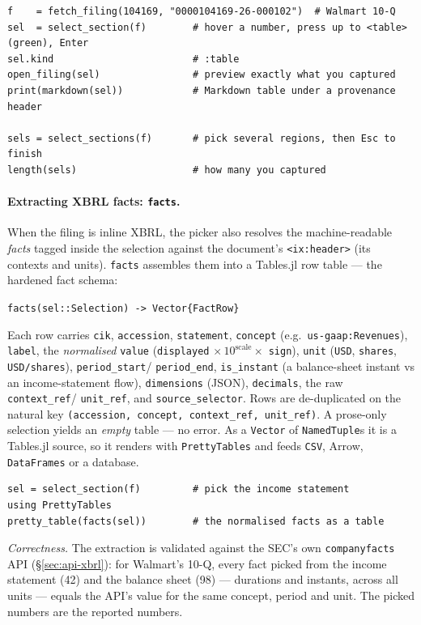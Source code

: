 \documentclass[11pt,a4paper]{report}
\newcommand{\sig}[1]{\medskip\noindent\texttt{#1}\par\medskip}
\begin{document}
\begin{lstlisting}
f    = fetch_filing(104169, "0000104169-26-000102")  # Walmart 10-Q
sel  = select_section(f)        # hover a number, press up to <table> (green), Enter
sel.kind                        # :table
open_filing(sel)                # preview exactly what you captured
print(markdown(sel))            # Markdown table under a provenance header

sels = select_sections(f)       # pick several regions, then Esc to finish
length(sels)                    # how many you captured
\end{lstlisting}

\paragraph{Extracting XBRL facts: \texttt{facts}.} When the filing is inline XBRL, the
picker also resolves the machine-readable \emph{facts} tagged inside the selection
against the document's \texttt{<ix:header>} (its contexts and units). \texttt{facts}
assembles them into a Tables.jl row table --- the hardened fact schema:

\sig{facts(sel::Selection) -> Vector\{FactRow\}}

\noindent Each row carries \texttt{cik}, \texttt{accession}, \texttt{statement},
\texttt{concept} (e.g.\ \texttt{us-gaap:Revenues}), \texttt{label}, the \emph{normalised}
\texttt{value} (\texttt{displayed} $\times\,10^{\mathrm{scale}}\times$ \texttt{sign}),
\texttt{unit} (\texttt{USD}, \texttt{shares}, \texttt{USD/shares}), \texttt{period\_start}/
\texttt{period\_end}, \texttt{is\_instant} (a balance-sheet instant vs an income-statement
flow), \texttt{dimensions} (JSON), \texttt{decimals}, the raw \texttt{context\_ref}/
\texttt{unit\_ref}, and \texttt{source\_selector}. Rows are de-duplicated on the natural
key \texttt{(accession, concept, context\_ref, unit\_ref)}. A prose-only selection yields
an \emph{empty} table --- no error. As a \texttt{Vector} of \texttt{NamedTuple}s it is a
Tables.jl source, so it renders with \texttt{PrettyTables} and feeds \texttt{CSV}, Arrow,
\texttt{DataFrames} or a database.

\begin{lstlisting}
sel = select_section(f)         # pick the income statement
using PrettyTables
pretty_table(facts(sel))        # the normalised facts as a table
\end{lstlisting}

\noindent\emph{Correctness.} The extraction is validated against the SEC's own
\texttt{companyfacts} API (\S\ref{sec:api-xbrl}): for Walmart's 10-Q, every fact picked
from the income statement (42) and the balance sheet (98) --- durations and instants,
across all units --- equals the API's value for the same concept, period and unit. The
picked numbers are the reported numbers.
\end{document}
